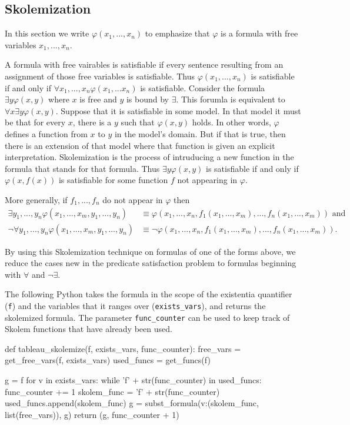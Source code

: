 \documentclass[a4paper,notitlepage]{scrartcl}
\let\phi\varphi
\begin{document}
\subsection{Skolemization}
In this section we write $\phi(x_1,...,x_n)$ to emphasize that $\phi$ is
   a formula with free variables $x_1,...,x_n$.

A formula with free vairables is satisfiable if every sentence resulting
   from an assignment of those free variables is satisfiable.
Thus $\phi(x_1,...,x_n)$ is satisfiable if and only if $\forall x_1,...,
   x_n\phi(x_1,...x_n)$ is satisfiable.
Consider the formula $\exists y \phi(x, y)$ where $x$ is free and $y$
   is bound by $\exists$.
This forumla is equivalent to $\forall x\exists y\phi(x, y)$.
Suppose that it is satisfiable in some model.
In that model it must be that for every $x$, there is a $y$ such 
   that $\phi(x,y)$ holds.
In other words, $\phi$ defines a function from $x$ to $y$ in the model's
   domain.
But if that is true, then there is an extension of that model where
   that function is given an explicit interpretation.
Skolemization is the process of intruducing a new function in the formula
   that stands for that formula.
Thus $\exists y\phi(x, y)$ is satisfiable if and only
   if $\phi(x, f(x))$ is satisfiable for some function $f$ not appearing
   in $\phi$.

More generally, if $f_1,...,f_n$ do not appear in $\phi$ then
\begin{align}
\exists y_1,...,y_n\phi(x_1,...,x_m, y_1,...,y_n)
   &\equiv \phi(x_1,...,x_n, f_1(x_1,...,x_m),...,f_n(x_1,...,x_m))\text{ and}\\
\lnot\forall y_1,...,y_n\phi(x_1,...,x_m, y_1,...,y_n)
   &\equiv \lnot \phi(x_1,...,x_n, f_1(x_1,...,x_m),...,f_n(x_1,...,x_m)).
\end{align}

By using this Skolemization technique on formulas of one of the
   forms above, we reduce the cases new in the predicate satisfaction
   problem to formulas beginning with $\forall$ and $\lnot\exists$. 

The following Python takes the formula in the scope of the 
   existentia quantifier (\texttt{f}) and the variables that it ranges
   over (\texttt{exists\_vars}), and returns the skolemized formula.
The parameter \texttt{func\_counter} can be used to keep track of Skolem 
   functions that have already been used.

\begin{code}
def tableau_skolemize(f, exists_vars, func_counter):
    free_vars = get_free_vars(f, exists_vars)
    used_funcs = get_funcs(f)

    g = f
    for v in exists_vars:
        while 'f' + str(func_counter) in used_funcs:
            func_counter += 1
        skolem_func = 'f' + str(func_counter)
        used_funcs.append(skolem_func)
        g = subst_formula({v:(skolem_func, list(free_vars))}, g)
    return (g, func_counter + 1)
\end{code}
\end{document}
